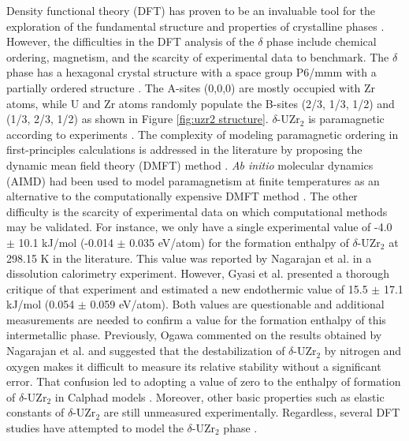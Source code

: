 \documentclass[preprint,12pt]{elsarticle}
\begin{document}
Density functional theory (DFT) has proven to be an invaluable tool for the exploration of the fundamental structure and properties of crystalline phases  \cite{cohen_challenges_2012, burke_perspective_2012}. However, the difficulties in the DFT analysis of the $\delta$ phase include chemical ordering, magnetism, and the scarcity of experimental data to benchmark. The $\delta$ phase has a hexagonal crystal structure with a space group P6/mmm with a partially ordered structure  \cite{akabori_stability_1992, akabori_lattice_1995}. The A-sites (0,0,0) are mostly occupied with Zr atoms, while U and Zr atoms randomly populate the B-sites (2/3, 1/3, 1/2) and (1/3, 2/3, 1/2) as shown in Figure \ref{fig:uzr2 structure}. $\delta$-UZr$_2$ is paramagnetic according to experiments  \cite{ding_magnetic_2020}. The complexity of modeling paramagnetic ordering in first-principles calculations is addressed in the literature by proposing the dynamic mean field theory (DMFT) method  \cite{anisimov_investigation_2014, abrikosov_recent_2016}. \textit{Ab initio} molecular dynamics (AIMD) had been used to model paramagnetism at finite temperatures as an alternative to the computationally expensive DMFT method  \cite{steneteg_equation_2012}. 
The other difficulty is the scarcity of experimental data on which computational methods may be validated. For instance, we only have a single experimental value of -4.0 $\pm$ 10.1 kJ/mol (-0.014 $\pm$ 0.035 eV/atom) for the formation enthalpy of $\delta$-UZr$_2$ at 298.15 K in the literature. This value was reported by Nagarajan et al. \cite{nagarajan_enthalpy_1993} in a dissolution calorimetry experiment. However, Gyasi et al. \cite{gyasi_about_2022} presented a thorough critique of that experiment and estimated a new endothermic value of 15.5 $\pm$ 17.1 kJ/mol (0.054 $\pm$ 0.059 eV/atom). Both values are questionable and additional measurements are needed to confirm a value for the formation enthalpy of this intermetallic phase. Previously, Ogawa \cite{ogawa_free_1994} commented on the results obtained by Nagarajan et al. \cite{nagarajan_enthalpy_1993} and suggested that the destabilization of $\delta$-UZr$_2$ by nitrogen and oxygen makes it difficult to measure its relative stability without a significant error. That confusion led to adopting a value of zero to the enthalpy of formation of $\delta$-UZr$_2$ in Calphad models \cite{chevalier_progress_2004}. Moreover, other basic properties such as elastic constants of $\delta$-UZr$_2$ are still unmeasured experimentally. Regardless, several DFT studies have attempted to model the $\delta$-UZr$_{2}$ phase \cite{xie_correlation_2013, matar_first_2017, ding_magnetic_2020, ghosh_chemical_2021}. 
\end{document}
